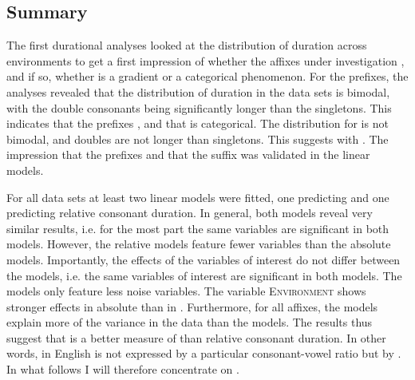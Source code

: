 \subsection{Summary} \label{Summary Corpus Study}

The first durational analyses looked at the distribution of duration across environments to get a first impression of whether the affixes under investigation , and if so, whether  is a gradient or a categorical phenomenon. 
For the prefixes, the analyses revealed that the distribution of duration in the data sets is bimodal, with the double consonants being significantly longer than the singletons. This indicates that the prefixes , and that  is categorical. The distribution for  is not bimodal, and doubles are not longer than singletons. This suggests  with . The impression that the prefixes  and that the suffix  was validated in the linear models.


For all data sets at least two linear models were fitted, one predicting  and one predicting relative consonant duration. 
In general, both models reveal very similar results, i.e. for the most part the same variables are significant in both models. However, the relative models feature fewer variables than the absolute models.  Importantly, the effects of the variables of interest do not differ between the models, i.e. the same variables of interest are significant in both models. The  models only feature less noise variables. 
The variable \textsc{Environment} shows stronger effects in absolute than in . 
Furthermore, for all affixes, the  models explain more of the variance in the data than the  models. 
The results thus suggest that  is a better measure of  than relative consonant duration. In other words,  in English is not expressed by a particular consonant-vowel ratio but by . 
In what follows I will therefore concentrate on .

